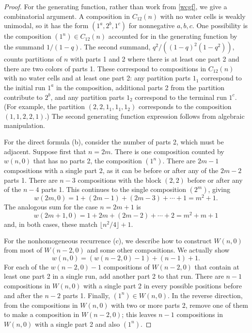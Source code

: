 \documentclass[]{interact}
\theoremstyle{plain}
\numberwithin{equation}{section} %
\numberwithin{table}{section} %
\numberwithin{figure}{section}
\begin{document}
\begin{proof}
For the generating function, rather than work from \eqref{wcgf}, we give a combinatorial argument.  A composition in $C_{12}(n)$ with no water cells is weakly unimodal, so it has the form $(1^a, 2^b, 1^c)$ for nonnegative $a,b,c$.  One possibility is the composition $(1^n) \in C_{12}(n)$ accounted for in the generating function by the summand $1/(1-q)$.  The second summand, $q^2/((1-q)^2(1-q^2))$, counts partitions of $n$ with parts 1 and 2 where there is at least one part 2 and there are two colors of parts 1.  These correspond to compositions in $C_{12}(n)$ with no water cells and at least one part 2: any partition parts $1_1$ correspond to the initial run $1^a$ in the composition, additional parts 2 from the partition contribute to $2^b$, and any partition parts $1_2$ correspond to the terminal run $1^c$.  (For example, the partition $(2,2,1_1,1_1,1_2)$ corresponds to the composition $(1,1,2,2,1)$.)  The second generating function expression follows from algebraic manipulation.

For the direct formula (b), consider the number of parts 2, which must be adjacent.  Suppose first that $n = 2m$.  There is one composition counted by $w(n,0)$ that has no parts 2, the composition $(1^n)$.  There are $2m-1$ compositions with a single part 2, as it can be before or after any of the $2m-2$ parts 1.  There are $n-3$ compositions with the block $(2,2)$ before or after any of the $n-4$ parts 1.  This continues to the single composition $(2^m)$, giving
\[w(2m,0) = 1 + (2m-1) + (2m-3) + \cdots + 1 = m^2 + 1.\]
The analogous sum for the case $n = 2m+1$ is
\[w(2m+1,0) = 1 + 2m + (2m-2) + \cdots + 2 = m^2 + m + 1\]
and, in both cases, these match $\lfloor n^2/4 \rfloor + 1$.

For the nonhomogeneous recurrence (c), we describe how to construct $W(n,0)$ from most of $W(n-2,0)$ and some other compositions.  We actually show 
\[w(n,0) = (w(n-2,0) - 1) + (n-1) + 1.\]
For each of the $w(n-2,0) - 1$ compositions of $W(n-2,0)$ that contain at least one part 2 in a single run, add another part 2 to that run.  There are $n-1$ compositions in $W(n,0)$ with a single part 2 in every possible positions before and after the $n-2$ parts 1.  Finally, $(1^n) \in W(n,0)$.  In the reverse direction, from the compositions in $W(n,0)$ with two or more parts 2, remove one of them to make a composition in $W(n-2,0)$; this leaves $n-1$ compositions in $W(n,0)$ with a single part 2 and also $(1^n)$.


\end{proof}
\end{document}
